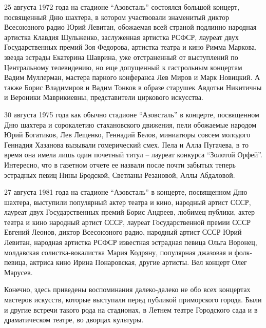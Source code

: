 25 августа 1972 года на стадионе \enquote{Азовсталь}  состоялся большой концерт,
посвященный Дню шахтера, в котором участвовали знаменитый диктор Всесоюзного
радио Юрий Левитан, обожаемая всей страной подлинно народная артистка Клавдия
Шульженко, заслуженная артистка РСФСР, лауреат двух Государственных  премий
Зоя Федорова, артистка театра и кино  Римма Маркова, звезда эстрады Екатерина
Шаврина, уже отстраненный от выступлений по Центральному телевидению, но еще
допущенный к гастрольным концертам Вадим Муллерман, мастера парного конферанса
Лев Миров и Марк Новицкий. А также Борис Владимиров и Вадим Тонков в образе
старушек Авдотьи  Никитичны и Вероники Маврикиевны, представители циркового
искусства.

30 августа 1975 года как обычно стадионе \enquote{Азовсталь} в концерте, посвященном
Дню шахтера и сорокалетию стахановского движения, пели обожаемые народом Юрий
Богатиков, Лев Лещенко, Геннадий Белов, миниатюры совсем молодого Геннадия
Хазанова вызывали гомерический смех. Пела и Алла Пугачева, в то время она имела
лишь один почетный титул – лауреат конкурса \enquote{Золотой Орфей}. Интересно, что в
газетном отчете ее назвали после почти забытых теперь эстрадных певиц Нины
Бродской, Светланы Резановой, Аллы Абдаловой.

27 августа 1981 года на стадионе \enquote{Азовсталь} в концерте, посвященном Дню
шахтера, выступили популярный  актер театра и кино, народный артист СССР,
лауреат двух Государственных премий Борис Андреев,  любимец  публики,  актер
театра и кино народный артист СССР, лауреат Государственной премии СССР
Евгений Леонов, диктор Всесоюзного радио, народный артист СССР Юрий Левитан,
народная артистка РСФСР известная эстрадная певица Ольга Воронец,  молдавская
солистка-вокалистка Мария Кодряну, популярная  джазовая и фолк-певица, актриса
кино Ирина Понаровская, другие артисты. Вел концерт Олег Марусев.

Конечно, здесь приведены воспоминания далеко-далеко не обо всех концертах
мастеров искусств, которые выступали перед публикой приморского города.  Были и
другие встречи такого рода на стадионах, в Летнем театре Городского сада и в
драматическом театре, во дворцах культуры. 
